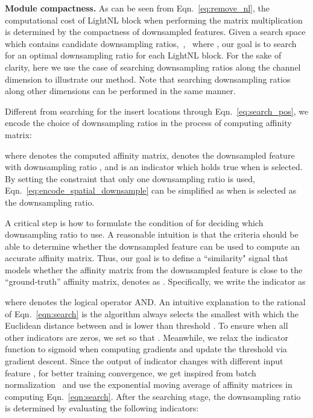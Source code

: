 \documentclass[10pt,twocolumn,letterpaper]{article}
\begin{document}
\vspace{0.5ex}\noindent\textbf{Module compactness.}  As can be seen from Eqn.~\eqref{eq:remove_nl}, the computational cost of LightNL block when performing the matrix multiplication is determined by the compactness of downsampled features. 
Given a search space  which contains  candidate downsampling ratios,~\ie,~ where , our goal is to search for an optimal downsampling ratio  for each LightNL block. For the sake of clarity, here we use the case of searching downsampling ratios along the channel dimension to illustrate our method.
Note that searching downsampling ratios along other dimensions can be performed in the same manner.


Different from searching for the insert locations through Eqn.~\eqref{eq:search_pos}, we encode the choice of downsampling ratios in the process of computing affinity matrix:

where  denotes the computed affinity matrix,  denotes the downsampled feature with downsampling ratio , and  is an indicator which holds true when  is selected. By setting the constraint that only  one downsampling ratio is used, Eqn.~\eqref{eq:encode_spatial_downsample} can be simplified as  when  is selected as the downsampling ratio.

A critical step is how to formulate the condition of  for deciding which downsampling ratio to use. A reasonable intuition is that the criteria should be able to determine
whether the downsampled feature can be used to compute an accurate affinity matrix. Thus, our goal is to define a ``similarity" signal that models whether the affinity matrix from the downsampled feature is close to the ``ground-truth'' affinity matrix, denotes as . Specifically, we write the indicator as

where  denotes the logical operator AND. An intuitive explanation to the rational of Eqn.~\eqref{eqn:search} is
the algorithm always selects the smallest  with which the Euclidean distance between  and  is lower than threshold .
To ensure  when all other indicators are zeros, we set  so that . 
Meanwhile, we relax the indicator function to sigmoid when computing gradients and update the threshold  via gradient descent. 
Since the output of indicator changes with different input feature , for better training convergence, we get inspired from batch normalization~\cite{ioffe2015batch} and use the exponential moving average of affinity matrices in computing Eqn.~\eqref{eqn:search}.
After the searching stage, the downsampling ratio is determined by evaluating the following indicators:
\end{document}
